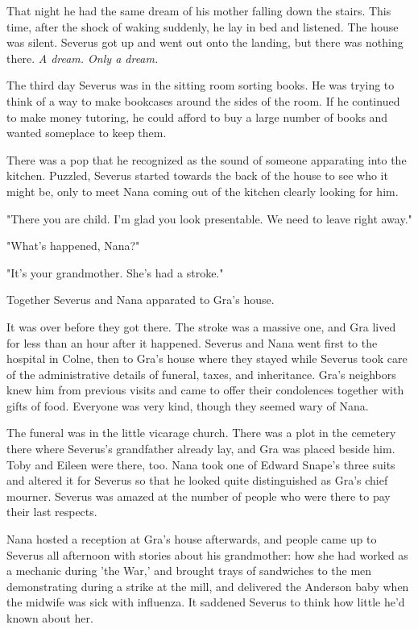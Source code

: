 \documentclass[a4paper,11pt]{article}
\begin{document}
That night he had the same dream of his mother falling down the stairs. This time, after the shock of waking suddenly, he lay in bed and listened. The house was silent. Severus got up and went out onto the landing, but there was nothing there. \emph{A dream. Only a dream.}

The third day Severus was in the sitting room sorting books. He was trying to think of a way to make bookcases around the sides of the room. If he continued to make money tutoring, he could afford to buy a large number of books and wanted someplace to keep them.

There was a pop that he recognized as the sound of someone apparating into the kitchen. Puzzled, Severus started towards the back of the house to see who it might be, only to meet Nana coming out of the kitchen clearly looking for him.

"There you are child. I'm glad you look presentable. We need to leave right away."

"What's happened, Nana?"

"It's your grandmother. She's had a stroke."

Together Severus and Nana apparated to Gra's house.

It was over before they got there. The stroke was a massive one, and Gra lived for less than an hour after it happened. Severus and Nana went first to the hospital in Colne, then to Gra's house where they stayed while Severus took care of the administrative details of funeral, taxes, and inheritance. Gra's neighbors knew him from previous visits and came to offer their condolences together with gifts of food. Everyone was very kind, though they seemed wary of Nana.

The funeral was in the little vicarage church. There was a plot in the cemetery there where Severus's grandfather already lay, and Gra was placed beside him. Toby and Eileen were there, too. Nana took one of Edward Snape's three suits and altered it for Severus so that he looked quite distinguished as Gra's chief mourner. Severus was amazed at the number of people who were there to pay their last respects.

Nana hosted a reception at Gra's house afterwards, and people came up to Severus all afternoon with stories about his grandmother: how she had worked as a mechanic during 'the War,' and brought trays of sandwiches to the men demonstrating during a strike at the mill, and delivered the Anderson baby when the midwife was sick with influenza. It saddened Severus to think how little he'd known about her.
\end{document}

